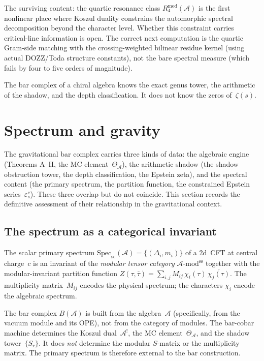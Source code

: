 \documentclass[11pt]{article}
\newcommand{\cA}{\mathcal{A}}
\begin{document}
The surviving content: the quartic resonance class
$R_4^{\mathrm{mod}}(\cA)$ is the first nonlinear place where
Koszul duality constrains the automorphic spectral decomposition
beyond the character level.  Whether this constraint carries
critical-line information is open.  The correct next computation
is the quartic Gram-side matching with the crossing-weighted
bilinear residue kernel (using actual DOZZ/Toda structure
constants), not the bare spectral measure (which fails by four
to five orders of magnitude).

The bar complex of a chiral algebra knows the exact genus tower,
the arithmetic of the shadow, and the depth classification.
It does not know the zeros of~$\zeta(s)$.


\section{Spectrum and gravity}
\label{sec:spectrum-gravity}

The gravitational bar complex carries three kinds of data:
the algebraic engine (Theorems A--H, the MC
element~$\Theta_\cA$), the arithmetic shadow (the shadow obstruction tower,
the depth classification, the Epstein zeta), and the spectral
content (the primary spectrum, the partition function, the
constrained Epstein series~$\varepsilon^c_s$).  These three
overlap but do not coincide.  This section records the definitive
assessment of their relationship in the gravitational context.

\subsection{The spectrum as a categorical invariant}

The scalar primary spectrum
$\mathrm{Spec}_{\mathrm{sc}}(\cA) = \{(\Delta_i, m_i)\}$ of a
2d~CFT at central charge~$c$ is an invariant of the
\emph{modular tensor category}
$\cA\text{-}\mathrm{mod}^{\mathrm{ss}}$ together with the
modular-invariant partition function $Z(\tau,\bar\tau)
= \sum_{i,j} M_{ij}\,\chi_i(\tau)\,\overline{\chi_j(\tau)}$.
The multiplicity matrix~$M_{ij}$ encodes the physical spectrum;
the characters $\chi_i$ encode the algebraic spectrum.

The bar complex $B(\cA)$ is built from the algebra~$\cA$
(specifically, from the vacuum module and its OPE), not from
the category of modules.  The bar-cobar machine determines the
Koszul dual~$\cA^!$, the MC element~$\Theta_\cA$, and the shadow
tower~$\{S_r\}$.  It does \emph{not} determine the modular
$S$-matrix or the multiplicity matrix.  The primary spectrum is
therefore external to the bar construction.
\end{document}
